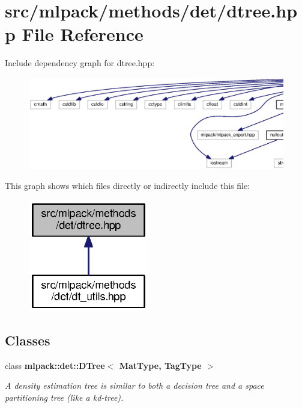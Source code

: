 \section{src/mlpack/methods/det/dtree.hpp File Reference}
\label{dtree_8hpp}
Include dependency graph for dtree.\+hpp\+:
\nopagebreak
\begin{figure}[H]
\begin{center}
\leavevmode
\includegraphics[width=350pt]{dtree_8hpp__incl}
\end{center}
\end{figure}
This graph shows which files directly or indirectly include this file\+:
\nopagebreak
\begin{figure}[H]
\begin{center}
\leavevmode
\includegraphics[width=149pt]{dtree_8hpp__dep__incl}
\end{center}
\end{figure}
\subsection*{Classes}
\begin{DoxyCompactItemize}
\item 
class {\bf mlpack\+::det\+::\+D\+Tree$<$ Mat\+Type, Tag\+Type $>$}
\begin{DoxyCompactList}\small\item\em A density estimation tree is similar to both a decision tree and a space partitioning tree (like a kd-\/tree). \end{DoxyCompactList}\end{DoxyCompactItemize}
